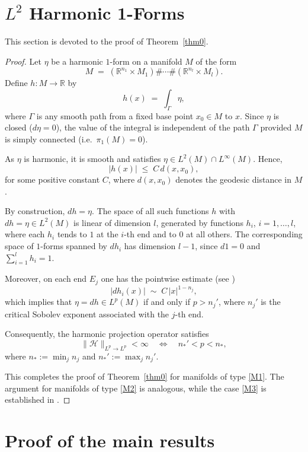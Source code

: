 \documentclass[12pt]{amsart}
\begin{document}
\section{$L^2$ Harmonic 1-Forms}

This section is devoted to the proof of Theorem~\ref{thm0}.

\begin{proof}
Let $\eta$ be a harmonic $1$-form on a manifold $M$ of the form
\[
M \;=\; (\mathbb{R}^{n_1} \times M_1) \# \cdots \# (\mathbb{R}^{n_l} \times M_l).
\]
Define $h \colon M \to \mathbb{R}$ by
\[
h(x) \;=\; \int_\Gamma \eta,
\]
where $\Gamma$ is any smooth path from a fixed base point $x_0 \in M$ to $x$. Since $\eta$ is closed ($d\eta=0$), the value of the integral is independent of the path $\Gamma$ provided $M$ is simply connected (i.e.\ $\pi_1(M)=0$).  

As $\eta$ is harmonic, it is smooth and satisfies $\eta \in L^2(M) \cap L^\infty(M)$. Hence,
\[
|h(x)| \;\leq\; C\, d(x,x_0),
\]
for some positive  constant $C$, where $d(x,x_0)$ denotes the geodesic distance in $M$.

By construction, $dh=\eta$. The space of all such functions $h$ with $dh=\eta \in L^2(M)$ is linear of dimension $l$, generated by functions $h_i$, $i=1,\dots,l$, where each $h_i$ tends to $1$ at the $i$-th end and to $0$ at all others. The corresponding space of $1$-forms spanned by $dh_i$ has dimension $l-1$, since $d1=0$ and $\sum_{i=1}^l h_i = 1$.

Moreover, on each end $E_j$ one has the pointwise estimate (see \cite[Lemma~2.7]{HS})
\[
|dh_i(x)| \;\sim\; C\, |x|^{1-n_j},
\]
which implies that $\eta = dh \in L^p(M)$ if and only if $p>n_j'$, where $n_j'$ is the critical Sobolev exponent associated with the $j$-th end.

Consequently, the harmonic projection operator satisfies
\[
\|\mathcal{H}\|_{L^p \to L^p} < \infty
\quad \Longleftrightarrow \quad
n_*' < p < n_*,
\]
where
$n_* := \min_j n_j $
and $n_*' := \max_j n_j'$.

This completes the proof of Theorem~\ref{thm0} for manifolds of type \eqref{M1}.  
The argument for manifolds of type \eqref{M2} is analogous, while the case \eqref{M3} is established in \cite[Proposition~3.3]{CDS}.
\end{proof}

\section{Proof of the main results}\label{sec6}
\end{document}
